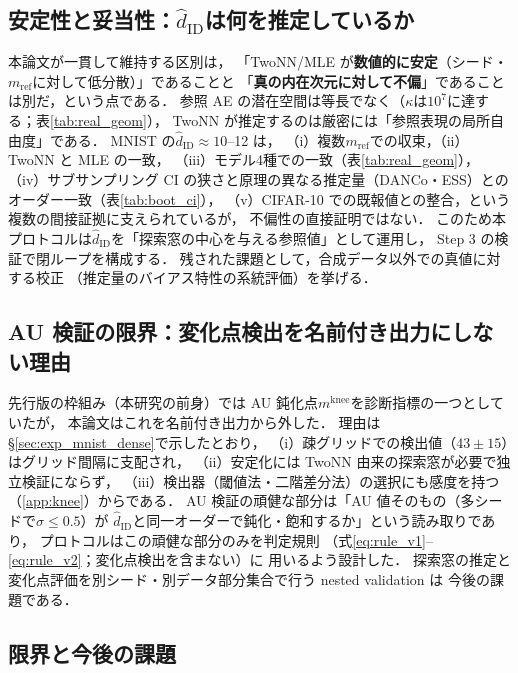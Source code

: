 \documentclass[11pt,a4paper]{jsarticle}
\newcommand{\hatdID}{\hat{d}_{\mathrm{ID}}}
\newcommand{\kap}{\kappa}
\newcommand{\mknee}{m^{\mathrm{knee}}}
\begin{document}
\subsection{安定性と妥当性：$\hatdID$は何を推定しているか}\label{sec:disc_twonn}

本論文が一貫して維持する区別は，
「TwoNN/MLE が\textbf{数値的に安定}（シード・$m_{\mathrm{ref}}$に対して低分散）」であることと
「\textbf{真の内在次元に対して不偏}」であることは別だ，という点である．
参照 AE の潜在空間は等長でなく（$\kap$は$10^{7}$に達する；表\ref{tab:real_geom}），
TwoNN が推定するのは厳密には「参照表現の局所自由度」である．
MNIST の$\hatdID \approx 10$--12 は，
（i）複数$m_{\mathrm{ref}}$での収束，（ii）TwoNN と MLE の一致，
（iii）モデル4種での一致（表\ref{tab:real_geom}），
（iv）サブサンプリング CI の狭さと原理の異なる推定量（DANCo・ESS）との
オーダー一致（表\ref{tab:boot_ci}），
（v）CIFAR-10 での既報値との整合，という複数の間接証拠に支えられているが，
不偏性の直接証明ではない．
このため本プロトコルは$\hatdID$を「探索窓の中心を与える参照値」として運用し，
Step 3 の検証で閉ループを構成する．
残された課題として，合成データ以外での真値に対する校正
（推定量のバイアス特性の系統評価）を挙げる．

\subsection{AU 検証の限界：変化点検出を名前付き出力にしない理由}\label{sec:disc_knee}

先行版の枠組み（本研究の前身）では AU 鈍化点$\mknee$を診断指標の一つとしていたが，
本論文はこれを名前付き出力から外した．
理由は§\ref{sec:exp_mnist_dense}で示したとおり，
（i）疎グリッドでの検出値（$43 \pm 15$）はグリッド間隔に支配され，
（ii）安定化には TwoNN 由来の探索窓が必要で独立検証にならず，
（iii）検出器（閾値法・二階差分法）の選択にも感度を持つ（\ref{app:knee}）からである．
AU 検証の頑健な部分は「AU 値そのもの（多シードで$\sigma \leq 0.5$）が
$\hatdID$と同一オーダーで鈍化・飽和するか」という読み取りであり，
プロトコルはこの頑健な部分のみを判定規則
（式\eqref{eq:rule_v1}--\eqref{eq:rule_v2}；変化点検出を含まない）に
用いるよう設計した．
探索窓の推定と変化点評価を別シード・別データ部分集合で行う nested validation は
今後の課題である．

\subsection{限界と今後の課題}\label{sec:disc_limitation}
\end{document}
